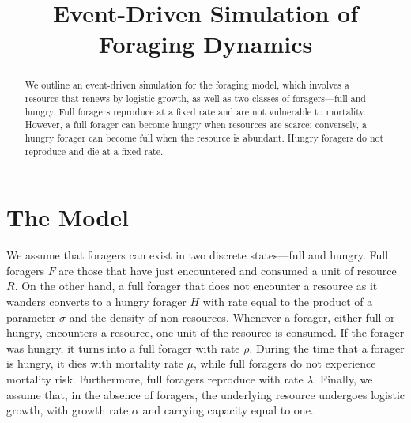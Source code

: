 \documentclass[11pt]{iopart}
\begin{document}
\title{Event-Driven Simulation of Foraging Dynamics}


\begin{abstract}

  We outline an event-driven simulation for the foraging model, which
  involves a resource that renews by logistic growth, as well as two classes
  of foragers---full and hungry.  Full foragers reproduce at a fixed rate and
  are not vulnerable to mortality.  However, a full forager can become hungry
  when resources are scarce; conversely, a hungry forager can become full
  when the resource is abundant.  Hungry foragers do not reproduce and die at
  a fixed rate.
\end{abstract}


\section{The Model}

We assume that foragers can exist in two discrete states---full and hungry.
Full foragers $F$ are those that have just encountered and consumed a unit of
resource $R$.  On the other hand, a full forager that does not encounter a
resource as it wanders converts to a hungry forager $H$ with rate equal to
the product of a parameter $\sigma$ and the density of non-resources.
Whenever a forager, either full or hungry, encounters a resource, one unit of
the resource is consumed.  If the forager was hungry, it turns into a full
forager with rate $\rho$.  During the time that a forager is hungry, it dies
with mortality rate $\mu$, while full foragers do not experience mortality
risk.  Furthermore, full foragers reproduce with rate $\lambda$.  Finally, we
assume that, in the absence of foragers, the underlying resource undergoes
logistic growth, with growth rate $\alpha$ and carrying capacity equal to
one.
\end{document}
